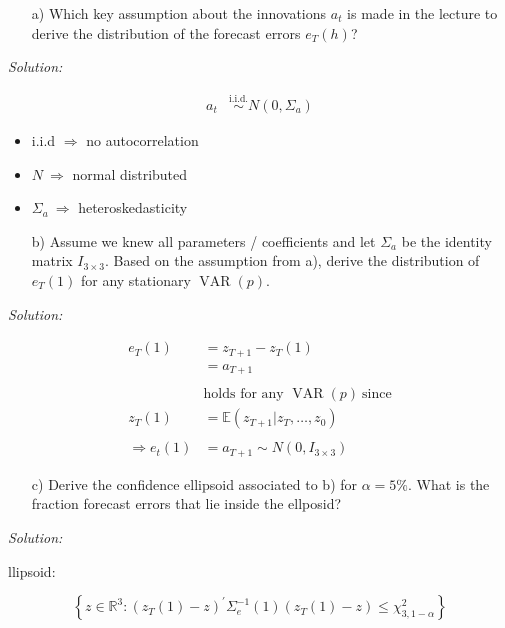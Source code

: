 \documentclass[12pt,a4paper]{article}
\newcommand{\VAR}{\operatorname{VAR}} %
\begin{document}
\begin{itemize}
  \item[a)] Which key assumption about the innovations $a_t$ is made in the lecture to derive the distribution of the forecast errors $e_T (h)$? 
\end{itemize}

\emph{Solution:}

\begin{align*}
  a_t & \overset{\text{i.i.d.}}{\sim} N (0, \Sigma_a)
\end{align*}

\begin{itemize}
  \item i.i.d $\Rightarrow$ no autocorrelation
  \item $N \ \Rightarrow$ normal distributed 
  \item $\Sigma_a \ \Rightarrow$ heteroskedasticity
\end{itemize}

\begin{itemize}
  \item[b)] Assume we knew all parameters / coefficients and let $\Sigma_a$ be the identity matrix $I_{3 \times 3}$. Based on the assumption from a), derive the distribution of $e_T (1)$  for any stationary $\VAR(p)$.  
\end{itemize}

\emph{Solution:}

\begin{align*}
  e_T (1) & = z_{T + 1} - z_T (1) \\
  & = a_{T + 1}\\
  \\
  & \text{holds for any } \VAR(p) \ \text{since}\\
  z_T (1) & = \mathbb{E} \left(z_{T + 1} | z_T, \ldots , z_0 \right)\\
  \\
  \Rightarrow e_t (1) & = a_{T + 1} \sim N \left(0, I_{3 \times 3} \right)
\end{align*}

\begin{itemize}
  \item[c)] Derive the confidence ellipsoid associated to b) for $\alpha = 5 \%$. What is the fraction forecast errors that lie inside the ellposid? 
\end{itemize}

\emph{Solution:}

llipsoid:

\[\left\{ z \in \mathbb{R}^{3}: \left( z_T (1) - z \right)^{'} \Sigma_e^{-1} (1) \left( z_T (1) - z \right) \leq \chi_{3, 1- \alpha}^{2}\right\}\]
\end{document}
